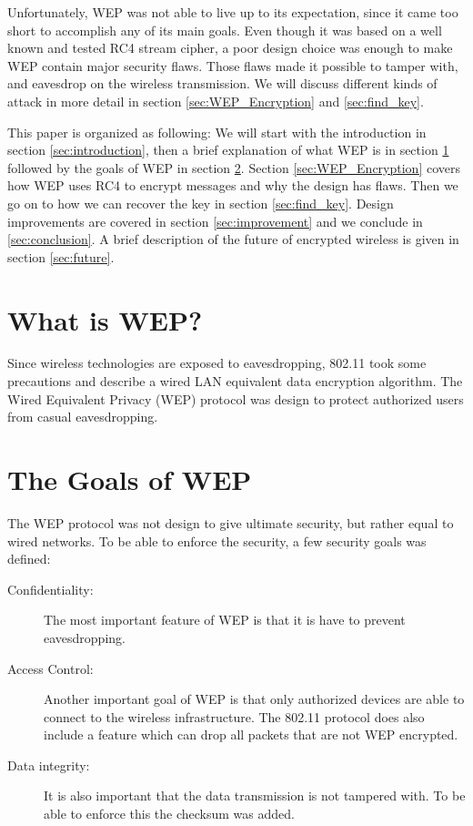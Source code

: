 \documentclass[twocolumn,11pt]{IEEEtran}
\begin{document}
Unfortunately, WEP was not able to live up to its expectation, since it came too short to accomplish any of its main goals. Even though it was based on a well known and tested RC4 stream cipher, a poor design choice was enough to make WEP contain major security flaws. Those flaws made it possible to tamper with, and eavesdrop on the wireless transmission. We will discuss different kinds of attack in more detail in section \ref{sec:WEP_Encryption} and \ref{sec:find_key}.

This paper is organized as following: We will start with the introduction in section \ref{sec:introduction}, then a brief explanation of what WEP is in section \ref{sec:whatiswep} followed by the goals of WEP in section \ref{sec:goals}. Section \ref{sec:WEP_Encryption} covers how WEP uses RC4 to encrypt messages and why the design has flaws. Then we go on to how we can recover the key in section \ref{sec:find_key}. Design improvements are covered in section \ref{sec:improvement} and we conclude in \ref{sec:conclusion}. A brief description of the future of encrypted wireless is given in section \ref{sec:future}.

\section {What is WEP?}
\label{sec:whatiswep}

Since wireless technologies are exposed to eavesdropping, 802.11 took some precautions and describe a wired LAN equivalent data encryption algorithm. The Wired Equivalent Privacy (WEP) protocol was design to protect authorized users from casual eavesdropping.  

\section {The Goals of WEP}
\label{sec:goals}

The WEP protocol was not design to give ultimate security, but rather equal to wired networks. To be able to enforce the security, a few security goals was defined\cite{IEEE:Fast}:\\

\begin{description}
\item[Confidentiality:] The most important feature of WEP is that it is have to prevent eavesdropping.
\item[Access Control:] Another important goal of WEP is that only authorized devices are able to connect to the wireless infrastructure. The 802.11 protocol does also include a feature which can drop all packets that are not WEP encrypted.
\item[Data integrity:] It is also important that the data transmission is not tampered with. To be able to enforce this the checksum was added.\\
\end{description}
\end{document}
